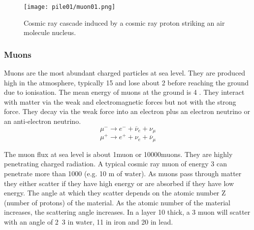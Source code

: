 \documentclass[twoside,titlepage,11pt,twocolumn,a4paper]{article}
\begin{document}
\begin{figure}
  \texttt{[image: pile01/muon01.png]}
  \caption{Cosmic ray cascade induced by a cosmic ray proton striking
    an air molecule nucleus. \citep{muonManual2005}}
\end{figure}

\subsubsection{Muons}
Muons are the most abundant charged particles at sea level. They are
produced high in the atmosphere, typically \unit{15}{\kilo\metre} and
lose about \unit{2}{\giga\electronvolt} before reaching the ground due
to ionisation. The mean energy of muons at the ground is
\unit{4}{\giga\electronvolt} \citep{PDG2011}. They interact with
matter via the weak and electromagnetic forces but not with the strong
force. They decay via the weak force into an electron plus an electron
neutrino or an anti-electron neutrino.
\[ \mu^- \rightarrow e^- + \overline{\nu}_e + \nu_\mu \]
\[ \mu^+ \rightarrow e^+ + \nu_e + \overline{\nu}_\mu \]

The muon flux at sea level is about
\unit{1}{muon\usk\rpsquare{\centi\metre}\usk\reciprocal\minute}
\citep{statisticalRec2007} or
\unit{10000}{muons\usk\rpsquare\metre\usk\reciprocal\minute}. They are
highly penetrating charged radiation.  A typical cosmic ray muon of
energy \unit{3}{\giga\electronvolt} can penetrate more than
\unit{1000}{\gram\usk\rpsquare{\centi\metre}} (e.g. 10 m of water). As
muons pass through matter they either scatter if they have high energy
or are absorbed if they have low energy. The angle at which they
scatter depends on the atomic number Z (number of protons) of the
material. As the atomic number of the material increases, the
scattering angle increases. In a layer \unit{10}{\centi\metre} thick,
a \unit{3}{\giga\electronvolt} muon will scatter with an angle of
\unit{2.3}{\milli\radian} in water, \unit{11}{\milli\radian} in iron
and \unit{20}{\milli\radian} in lead. \citep{Borozdin2003}
\end{document}
